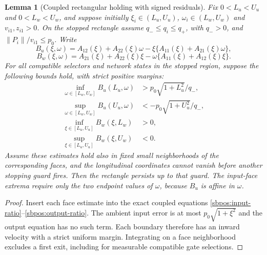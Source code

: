 \documentclass{article} %
\theoremstyle{plain}
\newtheorem{lemma}[theorem]{Lemma}
\theoremstyle{definition}
\theoremstyle{remark}
\begin{document}
\begin{lemma}[Coupled rectangular holding with signed residuals]
\label{sbpos:rectangle}
Fix $0<L_u<U_u$ and $0<L_w<U_w$, and suppose initially
$\xi_i\in(L_u,U_u)$, $\omega_i\in(L_w,U_w)$ and $v_{i1},z_{i1}>0$.
On the stopped rectangle assume $q_-\le q_i\le q_+$, with $q_->0$,
and $\|P_i\|/v_{i1}\le p_0$.
Write
\[
 B_u(\xi,\omega)=A_{12}(\xi)+A_{22}(\xi)\omega
                 -\xi\{A_{11}(\xi)+A_{21}(\xi)\omega\},
\]
\[
 B_w(\xi,\omega)=A_{21}(\xi)+A_{22}(\xi)\xi
                 -\omega\{A_{11}(\xi)+A_{12}(\xi)\xi\}.
\]
For all compatible selectors and network states in the stopped region,
suppose the following bounds hold, with strict positive margins:
\begin{align*}
 \inf_{\omega\in[L_w,U_w]} B_u(L_u,\omega)
       &>p_0\sqrt{1+L_u^2}/q_-,\\
 \sup_{\omega\in[L_w,U_w]} B_u(U_u,\omega)
       &<-p_0\sqrt{1+U_u^2}/q_-,\\
 \inf_{\xi\in[L_u,U_u]} B_w(\xi,L_w)&>0,\\
 \sup_{\xi\in[L_u,U_u]} B_w(\xi,U_w)&<0.
\end{align*}
Assume these estimates hold also in fixed small neighborhoods of the
corresponding faces, and the longitudinal coordinates cannot vanish
before another stopping guard fires. Then the rectangle persists up to
that guard. The input-face extrema require only the two endpoint values
of $\omega$, because $B_u$ is affine in $\omega$.
\end{lemma}
\begin{proof}
Insert each face estimate into the exact coupled equations
\eqref{sbpos:input-ratio}--\eqref{sbpos:output-ratio}.
The ambient input error is at most $p_0\sqrt{1+\xi^2}$ and the output
equation has no such term. Each boundary therefore has an inward velocity
with a strict uniform margin. Integrating on a face neighborhood excludes
a first exit, including for measurable compatible gate selections.
\end{proof}
\end{document}
